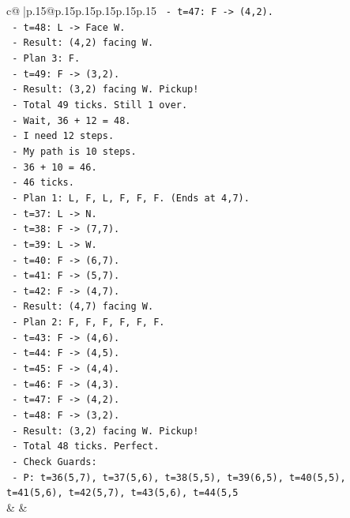 \documentclass{article}
\begin{document}
{\begin{supertabular}{c@{$\;$}|p{.15\linewidth}@{}p{.15\linewidth}p{.15\linewidth}p{.15\linewidth}p{.15\linewidth}p{.15\linewidth}}
{{{\texttt{      {-} t=47: F {-}> (4,2).} \\
\texttt{      {-} t=48: L {-}> Face W.} \\
\texttt{      {-} Result: (4,2) facing W.} \\
\texttt{    {-} Plan 3: F.} \\
\texttt{      {-} t=49: F {-}> (3,2).} \\
\texttt{      {-} Result: (3,2) facing W. Pickup!} \\
\texttt{    {-} Total 49 ticks. Still 1 over.} \\
\texttt{    {-} Wait, 36 + 12 = 48.} \\
\texttt{    {-} I need 12 steps.} \\
\texttt{    {-} My path is 10 steps.} \\
\texttt{    {-} 36 + 10 = 46.} \\
\texttt{    {-} 46 ticks.} \\
\texttt{    {-} Plan 1: L, F, L, F, F, F. (Ends at 4,7).} \\
\texttt{      {-} t=37: L {-}> N.} \\
\texttt{      {-} t=38: F {-}> (7,7).} \\
\texttt{      {-} t=39: L {-}> W.} \\
\texttt{      {-} t=40: F {-}> (6,7).} \\
\texttt{      {-} t=41: F {-}> (5,7).} \\
\texttt{      {-} t=42: F {-}> (4,7).} \\
\texttt{      {-} Result: (4,7) facing W.} \\
\texttt{    {-} Plan 2: F, F, F, F, F, F.} \\
\texttt{      {-} t=43: F {-}> (4,6).} \\
\texttt{      {-} t=44: F {-}> (4,5).} \\
\texttt{      {-} t=45: F {-}> (4,4).} \\
\texttt{      {-} t=46: F {-}> (4,3).} \\
\texttt{      {-} t=47: F {-}> (4,2).} \\
\texttt{      {-} t=48: F {-}> (3,2).} \\
\texttt{      {-} Result: (3,2) facing W. Pickup!} \\
\texttt{    {-} Total 48 ticks. Perfect.} \\
\texttt{    {-} Check Guards:} \\
\texttt{      {-} P: t=36(5,7), t=37(5,6), t=38(5,5), t=39(6,5), t=40(5,5), t=41(5,6), t=42(5,7), t=43(5,6), t=44(5,5} \\
            }
        }
    }
    & & \\ \\


\end{supertabular}}
\end{document}

